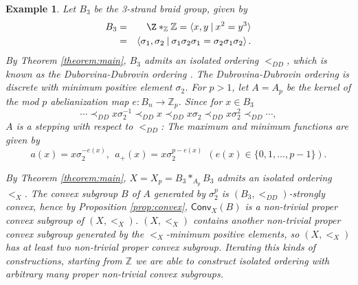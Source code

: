 \documentclass[10pt]{amsart}
\newtheorem{example}[theorem]{Example}}
\numberwithin{equation}{section}
\begin{document}
\begin{example}
\label{exam:convex}
Let $B_{3}$ be the 3-strand braid group, given by 
\begin{eqnarray*}
 B_{3} & =  & \Z*_{\mathbb{Z}} {\mathbb{Z}} = \langle x,y \: | \: x^{2}=y^{3} \rangle\\
 & = & \left \langle 
\sigma_{1},\sigma_{2} \: | \: \sigma_{1}\sigma_{2}\sigma_{1}=\sigma_{2}\sigma_{1}\sigma_{2} \right\rangle .
\end{eqnarray*}
By Theorem \ref{theorem:main}, $B_{3}$ admits an isolated ordering $<_{DD}$, which is known as the Duborvina-Dubrovin ordering \cite{dd}.
The Dubrovina-Dubrovin ordering is discrete with minimum positive element $\sigma_{2}$. For $p>1$, let $A=A_p$ be the kernel of the mod $p$ abelianization map $e:B_{n} \rightarrow {\mathbb{Z}}_{p}$. Since for  $x \in B_{3}$
\[ \cdots \prec_{DD} x \sigma_{2}^{-1} \prec_{DD} x \prec_{DD} x \sigma_{2} \prec_{DD} x \sigma_{2}^{2} \prec_{DD} \cdots, \]
$A$ is a stepping with respect to $<_{DD}$: The maximum and minimum functions are given by
\[ a(x)=x \sigma_{2}^{-e(x)},\ \  a_{+}(x) = x \sigma_{2}^{p-e(x)} \ \ ( e(x) \in \{0,1,\ldots,p-1\}). \]

By Theorem \ref{theorem:main}, $X=X_p=B_{3}*_{A_p}B_{3}$ admits an isolated ordering $<_{X}$. The convex subgroup $B$ of $A$ generated by $\sigma_{2}^{p}$ is $(B_{3},<_{DD})$-strongly convex, hence by Proposition \ref{prop:convex}, ${\mathsf{Conv}}_{X}(B)$ is a non-trivial proper convex subgroup of $(X,<_{X})$.
$(X,<_{X})$ contains another non-trivial proper convex subgroup generated by the $<_{X}$-minimum positive elements, so $(X,<_{X})$ has at least two non-trivial proper convex subgroup. 
Iterating this kinds of constructions, starting from ${\mathbb{Z}}$ we are able to construct isolated ordering with arbitrary many proper non-trivial convex subgroups.
\end{example}
\end{document}
